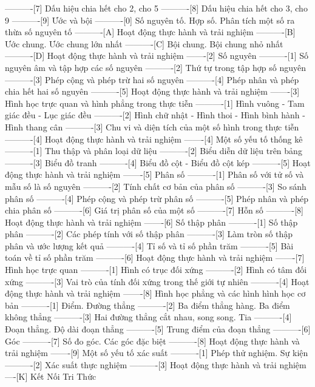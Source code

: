 ----------[7] Dấu hiệu chia hết cho 2, cho 5
----------[8] Dấu hiệu chia hết cho 3, cho 9
----------[9] Ước và bội
----------[0] Số nguyên tố. Hợp số. Phân tích một số ra thừa số nguyên tố
----------[A] Hoạt động thực hành và trải nghiệm
----------[B] Ước chung. Ước chung lớn nhất
----------[C] Bội chung. Bội chung nhỏ nhất
----------[D] Hoạt động thực hành và trải nghiệm
-------[2] Số nguyên
----------[1] Số nguyên âm và tập hợp các số nguyên
----------[2] Thứ tự trong tập hợp số nguyên
----------[3] Phép cộng và phép trừ hai số nguyên
----------[4] Phép nhân và phép chia hết hai số nguyên
----------[5] Hoạt động thực hành và trải nghiệm
-------[3] Hình học trực quan và hình phẳng trong thực tiễn
----------[1] Hình vuông - Tam giác đều - Lục giác đều
----------[2] Hình chữ nhật - Hình thoi - Hình bình hành - Hình thang cân
----------[3] Chu vi và diện tích của một số hình trong thực tiễn
----------[4] Hoạt động thực hành và trải nghiệm
-------[4] Một số yếu tố thống kê
----------[1] Thu thập và phân loại dữ liệu
----------[2] Biểu diễn dữ liệu trên bảng
----------[3] Biểu đồ tranh
----------[4] Biểu đồ cột - Biểu đồ cột kép
----------[5] Hoạt động thực hành và trải nghiệm
-------[5] Phân số
----------[1] Phân số với tử số và mẫu số là số nguyên
----------[2] Tính chất cơ bản của phân số
----------[3] So sánh phân số
----------[4] Phép cộng và phép trừ phân số
----------[5] Phép nhân và phép chia phân số
----------[6] Giá trị phân số của một số
----------[7] Hỗn số
----------[8] Hoạt động thực hành và trải nghiệm
-------[6] Số thập phân
----------[1] Số thập phân
----------[2] Các phép tính với số thập phân
----------[3] Làm tròn số thập phân và ước lượng kết quả
----------[4] Tỉ số và tỉ số phần trăm
----------[5] Bài toán về tỉ số phần trăm
----------[6] Hoạt động thực hành và trải nghiệm
-------[7] Hình học trực quan
----------[1] Hình có trục đối xứng
----------[2] Hình có tâm đối xứng
----------[3] Vai trò của tính đối xứng trong thế giới tự nhiên
----------[4] Hoạt động thực hành và trải nghiệm
-------[8] Hình học phẳng và các hình hình học cơ bản
----------[1] Điểm. Đường thẳng
----------[2] Ba điểm thẳng hàng. Ba điểm không thẳng
----------[3] Hai đường thẳng cắt nhau, song song. Tia
----------[4] Đoạn thẳng. Độ dài đoạn thẳng
----------[5] Trung điểm của đoạn thẳng
----------[6] Góc
----------[7] Số đo góc. Các góc đặc biệt
----------[8] Hoạt động thực hành và trải nghiệm
-------[9] Một số yếu tố xác suất
----------[1] Phép thử nghiệm. Sự kiện
----------[2] Xác suất thực nghiệm
----------[3] Hoạt động thực hành và trải nghiệm
----[K] Kết Nối Tri Thức
